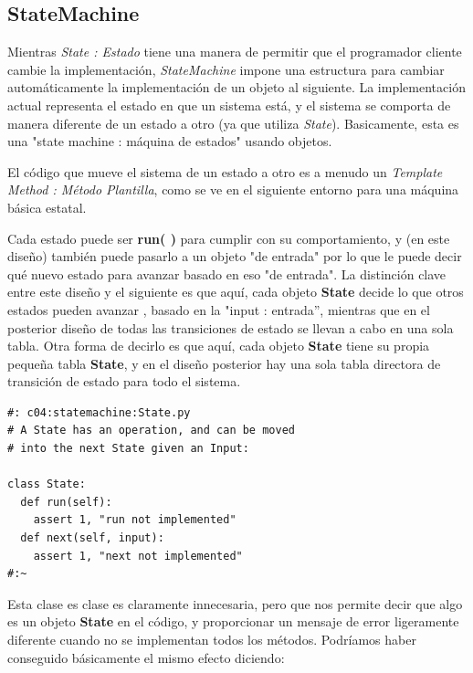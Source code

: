 \documentclass{article}
\begin{document}
\newpage

\subsection{StateMachine}
Mientras \textit{State : Estado} tiene una manera de permitir que el programador cliente cambie la implementación, \textit{StateMachine} impone una estructura para cambiar automáticamente la implementación de un objeto al siguiente. La implementación actual representa el estado en que un sistema está, y el sistema se comporta de manera diferente de un estado a otro (ya que utiliza \textit{State}). Basicamente, esta es una "state machine : máquina de estados" usando objetos.     \newline

El código que mueve el sistema de un estado a otro es a menudo un \textit{Template Method : Método Plantilla}, como se ve en el siguiente entorno para una máquina básica estatal.    \newline

Cada estado puede ser \textbf{run( )} para cumplir con su comportamiento, y (en este diseño) también puede pasarlo a un objeto "de entrada" por lo que le puede decir qué nuevo estado para avanzar basado en eso "de entrada".
La distinción clave entre este diseño y el siguiente es que aquí, cada objeto \textbf{State} decide lo que otros estados pueden avanzar , basado en la "input : entrada”, mientras que en el posterior diseño de todas las transiciones de estado se llevan a cabo en una sola tabla. Otra forma de decirlo es que aquí, cada objeto \textbf{State} tiene su propia pequeña tabla \textbf{State}, y en el diseño posterior hay una sola tabla directora de transición de estado para todo el sistema.   \newline

 \begin{lstlisting}
#: c04:statemachine:State.py 
# A State has an operation, and can be moved 
# into the next State given an Input: 

class State: 
  def run(self):  
    assert 1, "run not implemented" 
  def next(self, input): 
    assert 1, "next not implemented" 
#:~ 
 \end{lstlisting}
 
 Esta clase es clase es claramente innecesaria, pero que nos permite decir que algo es un objeto \textbf{State} en el código, y proporcionar un mensaje de error ligeramente diferente cuando no se implementan todos los métodos. Podríamos haber conseguido básicamente el mismo efecto diciendo:      \newline
 
\end{document}
